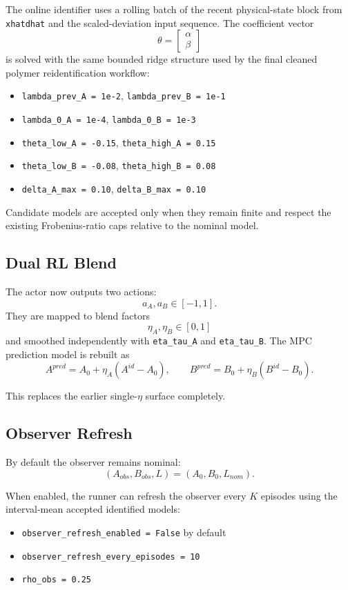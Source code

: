 The online identifier uses a rolling batch of the recent physical-state block from \texttt{xhatdhat} and the scaled-deviation input sequence. The coefficient vector
\[
\theta = \begin{bmatrix}\alpha \\ \beta\end{bmatrix}
\]
is solved with the same bounded ridge structure used by the final cleaned polymer reidentification workflow:
\begin{itemize}
    \item \texttt{lambda\_prev\_A = 1e-2}, \texttt{lambda\_prev\_B = 1e-1}
    \item \texttt{lambda\_0\_A = 1e-4}, \texttt{lambda\_0\_B = 1e-3}
    \item \texttt{theta\_low\_A = -0.15}, \texttt{theta\_high\_A = 0.15}
    \item \texttt{theta\_low\_B = -0.08}, \texttt{theta\_high\_B = 0.08}
    \item \texttt{delta\_A\_max = 0.10}, \texttt{delta\_B\_max = 0.10}
\end{itemize}

Candidate models are accepted only when they remain finite and respect the existing Frobenius-ratio caps relative to the nominal model.

\subsection{Dual RL Blend}

The actor now outputs two actions:
\[
a_A, a_B \in [-1, 1].
\]
They are mapped to blend factors
\[
\eta_A, \eta_B \in [0, 1]
\]
and smoothed independently with \texttt{eta\_tau\_A} and \texttt{eta\_tau\_B}. The MPC prediction model is rebuilt as
\[
A^{pred} = A_0 + \eta_A(A^{id} - A_0),
\qquad
B^{pred} = B_0 + \eta_B(B^{id} - B_0).
\]

This replaces the earlier single-$\eta$ surface completely.

\subsection{Observer Refresh}

By default the observer remains nominal:
\[
(A_{obs}, B_{obs}, L) = (A_0, B_0, L_{nom}).
\]

When enabled, the runner can refresh the observer every $K$ episodes using the interval-mean accepted identified models:
\begin{itemize}
    \item \texttt{observer\_refresh\_enabled = False} by default
    \item \texttt{observer\_refresh\_every\_episodes = 10}
    \item \texttt{rho\_obs = 0.25}
\end{itemize}

